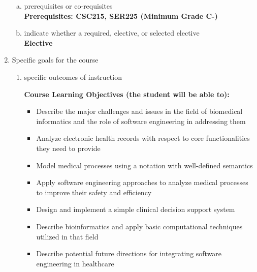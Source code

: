 \begin{enumerate}[1.]
\begin{enumerate}[a.]
\item prerequisites or co-requisites\\
  {\bfseries
    Prerequisites: CSC215, SER225 (Minimum Grade C-) \\  %
  }

\item indicate whether a required, elective, or selected elective\\ %
  {\bfseries
    Elective
  }

\end{enumerate}

\item Specific goals for the course
\begin{enumerate}
\item specific outcomes of instruction\\ %
  {\bfseries
    Course Learning Objectives (the student will be able to):
    \begin{itemize}
      \item Describe the major challenges and issues in the field of biomedical informatics and the role of software engineering in addressing them
      \item Analyze electronic health records with respect to core functionalities they need to provide
      \item Model medical processes using a notation with well-defined semantics
      \item Apply software engineering approaches to analyze medical processes to improve their safety and efficiency
      \item Design and implement a simple clinical decision support system
      \item Describe bioinformatics and apply basic computational techniques utilized in that field
      \item Describe potential future directions for integrating software engineering in healthcare
    \end{itemize}
  }


\end{enumerate}
\end{enumerate}
